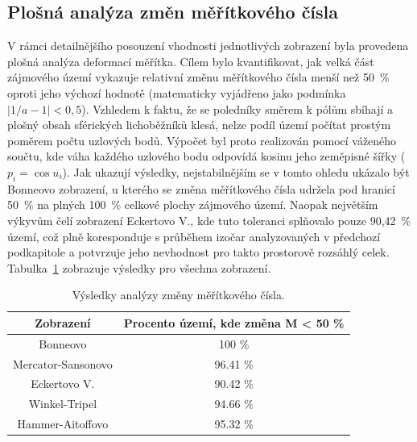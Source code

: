 \newpage
\subsection*{Plošná analýza změn měřítkového čísla}
V rámci detailnějšího posouzení vhodnosti jednotlivých zobrazení byla provedena plošná analýza deformací měřítka.
Cílem bylo kvantifikovat, jak velká část zájmového území vykazuje relativní změnu měřítkového čísla menší než 50~\% oproti jeho výchozí hodnotě (matematicky vyjádřeno jako podmínka $|1/a - 1| < 0,5$).
Vzhledem k faktu, že se poledníky směrem k pólům sbíhají a plošný obsah sférických lichoběžníků klesá, nelze podíl území počítat prostým poměrem počtu uzlových bodů.
Výpočet byl proto realizován pomocí váženého součtu, kde váha každého uzlového bodu odpovídá kosinu jeho zeměpisné šířky ($p_i = \cos u_i$).
Jak ukazují výsledky, nejstabilnějším se v tomto ohledu ukázalo být Bonneovo zobrazení, u kterého se změna měřítkového čísla udržela pod hranicí 50~\% na plných 100~\% celkové plochy zájmového území.
Naopak největším výkyvům čelí zobrazení Eckertovo V., kde tuto toleranci splňovalo pouze 90,42~\% území, což plně koresponduje s průběhem izočar analyzovaných v předchozí podkapitole a potvrzuje jeho nevhodnost pro takto prostorově rozsáhlý celek.
Tabulka~\ref{tab2} zobrazuje výsledky pro všechna zobrazení.


\begin{table}[H]
	\centering
	\begin{tabular}{|c||c|}
		\hline
		Zobrazení & Procento území, kde změna M < 50 \% \\
		\hline \hline
		Bonneovo  & 100 \%  \\
		\hline
		Mercator-Sansonovo  & 96.41 \%  \\
		\hline
		Eckertovo V.  & 90.42 \%  \\
		\hline
		Winkel-Tripel  & 94.66 \% \\
		\hline
		Hammer-Aitoffovo  & 95.32 \% \\
		\hline
	\end{tabular}
	\caption{Výsledky analýzy změny měřítkového čísla.}
	\label{tab2}
\end{table}

\newpage
